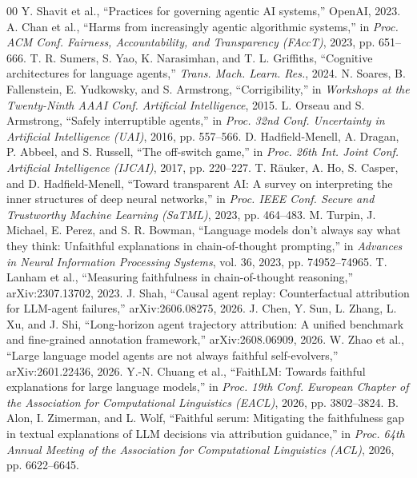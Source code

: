 \documentclass[conference]{IEEEtran}
\begin{document}
\begin{thebibliography}{00}
 Y. Shavit et al., ``Practices for governing agentic AI systems,'' OpenAI, 2023.
 A. Chan et al., ``Harms from increasingly agentic algorithmic systems,'' in \emph{Proc. ACM Conf. Fairness, Accountability, and Transparency (FAccT)}, 2023, pp. 651--666.
 T. R. Sumers, S. Yao, K. Narasimhan, and T. L. Griffiths, ``Cognitive architectures for language agents,'' \emph{Trans. Mach. Learn. Res.}, 2024.
 N. Soares, B. Fallenstein, E. Yudkowsky, and S. Armstrong, ``Corrigibility,'' in \emph{Workshops at the Twenty-Ninth AAAI Conf. Artificial Intelligence}, 2015.
 L. Orseau and S. Armstrong, ``Safely interruptible agents,'' in \emph{Proc. 32nd Conf. Uncertainty in Artificial Intelligence (UAI)}, 2016, pp. 557--566.
 D. Hadfield-Menell, A. Dragan, P. Abbeel, and S. Russell, ``The off-switch game,'' in \emph{Proc. 26th Int. Joint Conf. Artificial Intelligence (IJCAI)}, 2017, pp. 220--227.
 T. R\"auker, A. Ho, S. Casper, and D. Hadfield-Menell, ``Toward transparent AI: A survey on interpreting the inner structures of deep neural networks,'' in \emph{Proc. IEEE Conf. Secure and Trustworthy Machine Learning (SaTML)}, 2023, pp. 464--483.
 M. Turpin, J. Michael, E. Perez, and S. R. Bowman, ``Language models don't always say what they think: Unfaithful explanations in chain-of-thought prompting,'' in \emph{Advances in Neural Information Processing Systems}, vol. 36, 2023, pp. 74952--74965.
 T. Lanham et al., ``Measuring faithfulness in chain-of-thought reasoning,'' arXiv:2307.13702, 2023.
 J. Shah, ``Causal agent replay: Counterfactual attribution for LLM-agent failures,'' arXiv:2606.08275, 2026.
 J. Chen, Y. Sun, L. Zhang, L. Xu, and J. Shi, ``Long-horizon agent trajectory attribution: A unified benchmark and fine-grained annotation framework,'' arXiv:2608.06909, 2026.
 W. Zhao et al., ``Large language model agents are not always faithful self-evolvers,'' arXiv:2601.22436, 2026.
 Y.-N. Chuang et al., ``FaithLM: Towards faithful explanations for large language models,'' in \emph{Proc. 19th Conf. European Chapter of the Association for Computational Linguistics (EACL)}, 2026, pp. 3802--3824.
 B. Alon, I. Zimerman, and L. Wolf, ``Faithful serum: Mitigating the faithfulness gap in textual explanations of LLM decisions via attribution guidance,'' in \emph{Proc. 64th Annual Meeting of the Association for Computational Linguistics (ACL)}, 2026, pp. 6622--6645.

\end{thebibliography}
\end{document}
